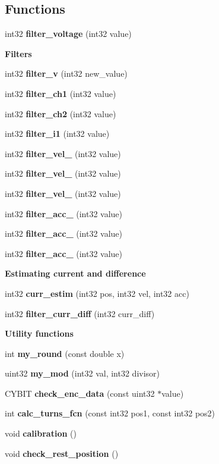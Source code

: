 \subsection*{Functions}
\begin{DoxyCompactItemize}
\item 
int32 \textbf{ filter\+\_\+voltage} (int32 value)
\end{DoxyCompactItemize}
\begin{Indent}\textbf{ Filters}\par
\begin{DoxyCompactItemize}
\item 
int32 \textbf{ filter\+\_\+v} (int32 new\+\_\+value)
\item 
int32 \textbf{ filter\+\_\+ch1} (int32 value)
\item 
int32 \textbf{ filter\+\_\+ch2} (int32 value)
\item 
int32 \textbf{ filter\+\_\+i1} (int32 value)
\item 
int32 \textbf{ filter\+\_\+vel\+\_} (int32 value)
\item 
int32 \textbf{ filter\+\_\+vel\+\_} (int32 value)
\item 
int32 \textbf{ filter\+\_\+vel\+\_} (int32 value)
\item 
int32 \textbf{ filter\+\_\+acc\+\_} (int32 value)
\item 
int32 \textbf{ filter\+\_\+acc\+\_} (int32 value)
\item 
int32 \textbf{ filter\+\_\+acc\+\_} (int32 value)
\end{DoxyCompactItemize}
\end{Indent}
\begin{Indent}\textbf{ Estimating current and difference}\par
\begin{DoxyCompactItemize}
\item 
int32 \textbf{ curr\+\_\+estim} (int32 pos, int32 vel, int32 acc)
\item 
int32 \textbf{ filter\+\_\+curr\+\_\+diff} (int32 curr\+\_\+diff)
\end{DoxyCompactItemize}
\end{Indent}
\begin{Indent}\textbf{ Utility functions}\par
\begin{DoxyCompactItemize}
\item 
int \textbf{ my\+\_\+round} (const double x)
\item 
uint32 \textbf{ my\+\_\+mod} (int32 val, int32 divisor)
\item 
C\+Y\+B\+IT \textbf{ check\+\_\+enc\+\_\+data} (const uint32 $\ast$value)
\item 
int \textbf{ calc\+\_\+turns\+\_\+fcn} (const int32 pos1, const int32 pos2)
\item 
void \textbf{ calibration} ()
\item 
void \textbf{ check\+\_\+rest\+\_\+position} ()
\end{DoxyCompactItemize}
\end{Indent}


